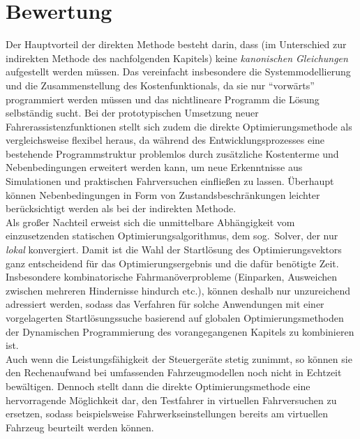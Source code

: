 \section{Bewertung}
Der Hauptvorteil der direkten Methode besteht darin, dass (im Unterschied zur indirekten Methode des nachfolgenden Kapitels) keine \emph{kanonischen Gleichungen} aufgestellt werden müssen. Das vereinfacht insbesondere die Systemmodellierung und die Zusammenstellung des Kostenfunktionals, da sie nur "`vorwärts"' programmiert werden müssen und das nichtlineare Programm die Lösung selbständig sucht. Bei der prototypischen Umsetzung neuer Fahrerassistenzfunktionen stellt sich zudem die direkte Optimierungsmethode als vergleichsweise flexibel heraus, da während des Entwicklungsprozesses eine bestehende Programmstruktur problemlos durch zusätzliche Kostenterme und Nebenbedingungen erweitert werden kann, um neue Erkenntnisse aus Simulationen und praktischen Fahrversuchen einfließen zu lassen. Überhaupt können Nebenbedingungen in Form von Zustandsbeschränkungen leichter berücksichtigt werden als bei der indirekten Methode. \\
Als großer Nachteil erweist sich die unmittelbare Abhängigkeit vom einzusetzenden statischen Optimierungsalgorithmus, dem sog.\ Solver, der \iA nur \emph{lokal} konvergiert. Damit ist die Wahl der Startlösung des Optimierungsvektors ganz entscheidend für das Optimierungsergebnis und die dafür benötigte Zeit. Insbesondere kombinatorische Fahrmanöverprobleme (Einparken, Ausweichen zwischen mehreren Hindernisse hindurch etc.), können deshalb nur unzureichend adressiert werden, sodass das Verfahren für solche Anwendungen mit einer vorgelagerten Startlösungssuche basierend auf globalen Optimierungsmethoden der Dynamischen Programmierung des vorangegangenen Kapitels zu kombinieren ist. \\ %
Auch wenn die Leistungsfähigkeit der Steuergeräte stetig zunimmt, so können sie den Rechenaufwand bei umfassenden Fahrzeugmodellen noch nicht in Echtzeit bewältigen. Dennoch stellt dann die direkte Optimierungsmethode eine hervorragende Möglichkeit dar, den Testfahrer in virtuellen Fahrversuchen zu ersetzen, sodass beispielsweise Fahrwerkseinstellungen bereits am virtuellen Fahrzeug beurteilt werden können.





\cleardoublepage
